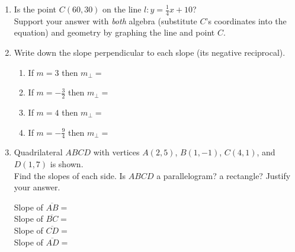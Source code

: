 \documentclass[12pt, twoside]{article}
\begin{document}
\begin{enumerate}
\newpage
\item Is the point $C(60,30)$ on the line $l: y=\frac{1}{4}x+10$? \\[0.5cm]
Support your answer with \emph{both} algebra (substitute $C$'s coordinates into the equation) and geometry by graphing the line and point $C$.
\begin{flushright}
  \end{flushright}

\newpage
\item Write down the slope perpendicular to each slope (its negative reciprocal).
  \begin{enumerate}[itemsep=0.9cm]
    \item If $m = 3$ then $m_{\perp}=$
    \item If $\displaystyle m = -\frac{3}{2}$ then $m_{\perp}=$
    \item If $m = 4$ then $m_{\perp}=$
    \item If $\displaystyle m = -\frac{9}{4}$ then $m_{\perp}=$
  \end{enumerate}

\newpage
\item Quadrilateral $ABCD$ with vertices $A(2,5)$, $B(1,-1)$, $C(4,1)$, and $D(1,7)$ is shown. \\[0.5cm]
Find the slopes of each side. Is $ABCD$ a parallelogram? a rectangle? Justify your answer.
\begin{multicols}{2}
  Slope of $\overline{AB}=$\\[1.5cm]
  Slope of $\overline{BC}=$\\[1.5cm]
  Slope of $\overline{CD}=$\\[1.5cm]
  Slope of $\overline{AD}=$\\
  \begin{flushright}
    \end{flushright}
  \end{multicols}


\end{enumerate}
\end{document}
